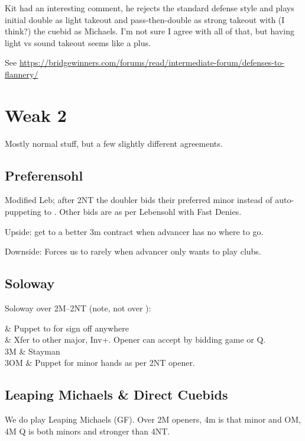 \documentclass[tom-ari]{subfile}
\begin{document}
	Kit had an interesting comment, he rejects the standard defense style and plays initial double as light takeout and pass-then-double as strong takeout with (I think?) the  cuebid as Michaels. I'm not sure I agree with all of that, but having light vs sound takeout seems like a plus.
	
	See \url{https://bridgewinners.com/forums/read/intermediate-forum/defenses-to-flannery/}
	
	\section{Weak 2}
	
	Mostly normal stuff, but a few slightly different agreements.
	
	\subsection{Preferensohl}
	
	Modified Leb; after 2NT the doubler bids their preferred minor instead of auto-puppeting to . Other bids are as per Lebensohl with Fast Denies.
	
	Upside: get to a better 3m contract when advancer has no where to go.
	
	Downside: Forces us to  rarely when advancer only wants to play clubs. 
	
	\subsection{Soloway}

	Soloway over 2M--2NT (note, not over ):
	
	\begin{bidtable}{}
		 & Puppet to  for sign off anywhere \\
		 & Xfer to other major, Inv+. Opener can accept by bidding game or Q. \\
		3M & Stayman \\
		3OM & Puppet for minor hands as per 2NT opener. \\
	\end{bidtable}

	\subsection{Leaping Michaels \& Direct Cuebids}
	
	We do play Leaping Michaels (GF). Over 2M openers, 4m is that minor and OM, 4M Q is both minors and stronger than 4NT. 
	
\end{document}
